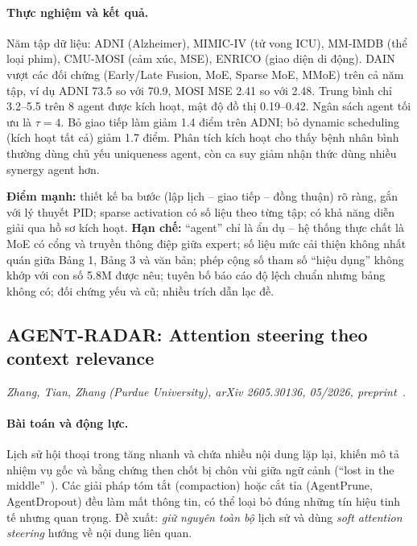 \paragraph{Thực nghiệm và kết quả.} Năm tập dữ liệu: ADNI (Alzheimer), MIMIC-IV (tử vong ICU), MM-IMDB (thể loại phim), CMU-MOSI (cảm xúc, MSE), ENRICO (giao diện di động). DAIN vượt các đối chứng (Early/Late Fusion, MoE, Sparse MoE, MMoE) trên cả năm tập, ví dụ ADNI 73.5 so với 70.9, MOSI MSE 2.41 so với 2.48. Trung bình chỉ 3.2--5.5 trên 8 agent được kích hoạt, mật độ đồ thị 0.19--0.42. Ngân sách agent tối ưu là $\tau = 4$. Bỏ giao tiếp làm giảm 1.4 điểm trên ADNI; bỏ dynamic scheduling (kích hoạt tất cả) giảm 1.7 điểm. Phân tích kích hoạt cho thấy bệnh nhân bình thường dùng chủ yếu uniqueness agent, còn ca suy giảm nhận thức dùng nhiều synergy agent hơn.

\begin{nhanxet}
\textbf{Điểm mạnh:} thiết kế ba bước (lập lịch -- giao tiếp -- đồng thuận) rõ ràng, gắn với lý thuyết PID; sparse activation có số liệu theo từng tập; có khả năng diễn giải qua hồ sơ kích hoạt. \textbf{Hạn chế:} ``agent'' chỉ là ẩn dụ -- hệ thống thực chất là MoE có cổng và truyền thông điệp giữa expert; số liệu mức cải thiện không nhất quán giữa Bảng 1, Bảng 3 và văn bản; phép cộng số tham số ``hiệu dụng'' không khớp với con số 5.8M được nêu; tuyên bố báo cáo độ lệch chuẩn nhưng bảng không có; đối chứng yếu và cũ; nhiều trích dẫn lạc đề.
\end{nhanxet}

\subsection{AGENT-RADAR: Attention steering theo context relevance}
\label{sec:radar}

\noindent\textit{Zhang, Tian, Zhang (Purdue University), arXiv 2605.30136, 05/2026, preprint~\cite{p8radar}.}

\paragraph{Bài toán và động lực.} Lịch sử hội thoại trong \MAS{} tăng nhanh và chứa nhiều nội dung lặp lại, khiến mô tả nhiệm vụ gốc và bằng chứng then chốt bị chôn vùi giữa ngữ cảnh (``lost in the middle''~\cite{lostmiddle}). Các giải pháp tóm tắt (compaction) hoặc cắt tỉa (AgentPrune, AgentDropout) đều làm mất thông tin, có thể loại bỏ đúng những tín hiệu tinh tế nhưng quan trọng. Đề xuất: \emph{giữ nguyên toàn bộ} lịch sử và dùng \emph{soft attention steering} hướng về nội dung liên quan.

